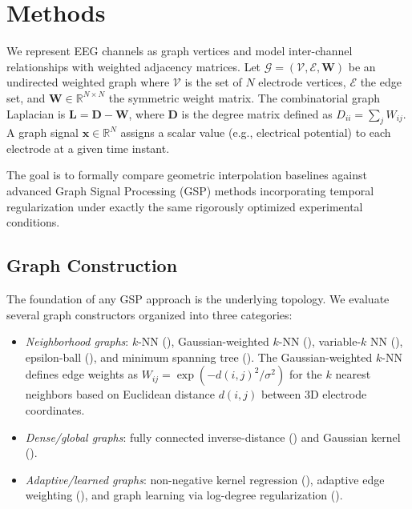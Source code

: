 \section{Methods}

We represent EEG channels as graph vertices and model inter-channel relationships with weighted adjacency matrices. Let $\mathcal{G} = (\mathcal{V}, \mathcal{E}, \mathbf{W})$ be an undirected weighted graph where $\mathcal{V}$ is the set of $N$ electrode vertices, $\mathcal{E}$ the edge set, and $\mathbf{W} \in \mathbb{R}^{N \times N}$ the symmetric weight matrix. The combinatorial graph Laplacian is $\mathbf{L} = \mathbf{D} - \mathbf{W}$, where $\mathbf{D}$ is the degree matrix defined as $D_{ii} = \sum_j W_{ij}$. A graph signal $\mathbf{x} \in \mathbb{R}^{N}$ assigns a scalar value (e.g., electrical potential) to each electrode at a given time instant.

The goal is to formally compare geometric interpolation baselines against advanced Graph Signal Processing (GSP) methods incorporating temporal regularization under exactly the same rigorously optimized experimental conditions.

\subsection{Graph Construction}
The foundation of any GSP approach is the underlying topology. We evaluate several graph constructors organized into three categories:
\begin{itemize}
\item \emph{Neighborhood graphs}: $k$-NN (), Gaussian-weighted $k$-NN (), variable-$k$ NN (), epsilon-ball (), and minimum spanning tree (). The Gaussian-weighted $k$-NN defines edge weights as $W_{ij} = \exp(-d(i,j)^2 / \sigma^2)$ for the $k$ nearest neighbors based on Euclidean distance $d(i,j)$ between 3D electrode coordinates.
\item \emph{Dense/global graphs}: fully connected inverse-distance () and Gaussian kernel ().
\item \emph{Adaptive/learned graphs}: non-negative kernel regression \cite{shekkizhar2020} (), adaptive edge weighting \cite{kalofolias2016} (), and graph learning via log-degree regularization \cite{kalofolias2016} ().
\end{itemize}

